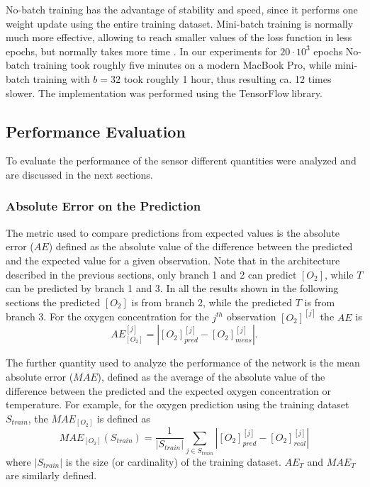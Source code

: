 \documentclass[9pt,twocolumn,twoside,pdftex]{optica}
\begin{document}
No-batch training has the advantage of stability and speed, since it performs one weight update using the entire training dataset. Mini-batch training is normally much more effective, allowing to reach smaller values of the loss function in less epochs, but normally takes more time \cite{Michelucci2017}. In our experiments for $20 \cdot 10^3$ epochs No-batch training took roughly five minutes on a modern MacBook Pro, while mini-batch training with $b=32$ took roughly 1 hour, thus resulting ca. 12 times slower. 
The implementation was performed using the TensorFlow\texttrademark $\ $library. 


\subsection{Performance Evaluation}

To evaluate the performance of the sensor different quantities were analyzed and are discussed in the next sections.


\subsubsection{Absolute Error on the Prediction}

The metric used to compare predictions from expected values is the absolute error ($AE$) defined as the absolute value of the difference between the predicted and the expected value for a given observation. Note that in the architecture described in the previous sections, only branch 1 and 2 can predict $[O_2]$, while $T$ can be predicted by branch 1 and 3. In all the results shown in the following sections the predicted $[O_2]$ is from branch 2, while the predicted $T$ is from branch 3. For the oxygen concentration for the 
$j^{th}$ observation $[O_2]^{[j]}$  the $AE$ is 
\begin{equation}
\label{AE}
AE^{{[j]}}_{[O_2]} = |[O_2]^{{[j]}}_{pred}-[O_2]^{[j]}_{meas}|.
\end{equation}

The further quantity used to analyze the performance of the network is the mean absolute error ($MAE$), defined as the average of the absolute value of the difference between the predicted and the expected oxygen concentration or temperature. For example, for the oxygen prediction using the training dataset $S_{train}$, the $MAE_{[O_2]}$ is defined as 
\begin{equation}
\label{MAE}
MAE_{[O_2]}(S_{train}) = \frac{1}{|S_{train}|} \sum_{j \in S_{train}}|[O_2]_{pred}^{[j]}-[O_2]_{real}^{[j]}|
\end{equation}
where $|S_{train}|$ is the size (or cardinality) of the training dataset. 
$AE_{T}$ and $MAE_T$ are similarly defined.
\end{document}
